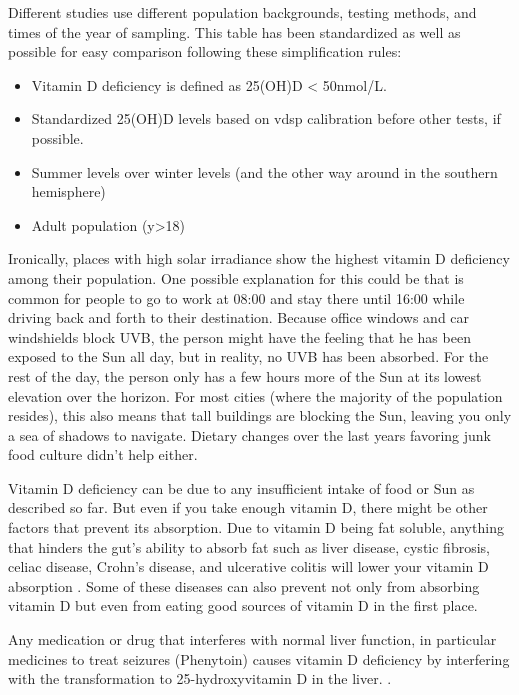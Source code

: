 Different studies use different population backgrounds, testing methods, and times of the year of sampling. This table has been standardized as well as possible for easy comparison following these simplification rules:

\begin{itemize}
    \item Vitamin D deficiency is defined as 25(OH)D < 50nmol/L.
    \item Standardized 25(OH)D levels based on \gls{vdsp} calibration before other tests, if possible.
    \item Summer levels over winter levels (and the other way around in the southern hemisphere)
    \item Adult population (y>18)
\end{itemize}

Ironically, places with high solar irradiance show the highest vitamin D deficiency among their population. One possible explanation for this could be that is common for people to go to work at 08:00 and stay there until 16:00 while driving back and forth to their destination. Because office windows and car windshields block UVB, the person might have the feeling that he has been exposed to the Sun all day, but in reality, no UVB has been absorbed. For the rest of the day, the person only has a few hours more of the Sun at its lowest elevation over the horizon. For most cities (where the majority of the population resides), this also means that tall buildings are blocking the Sun, leaving you only a sea of shadows to navigate. Dietary changes over the last years favoring junk food culture didn't help either.

Vitamin D deficiency can be due to any insufficient intake of food or Sun as described so far. But even if you take enough vitamin D, there might be other factors that prevent its absorption. Due to vitamin D being fat soluble, anything that hinders the gut's ability to absorb fat such as liver disease, cystic fibrosis, celiac disease, Crohn’s disease, and ulcerative colitis will lower your vitamin D absorption \cite{ref:Pappa2008}. Some of these diseases can also prevent not only from absorbing vitamin D but even from eating good sources of vitamin D in the first place.

Any medication or drug that interferes with normal liver function, in particular medicines to treat seizures (Phenytoin) causes vitamin D deficiency by interfering with the transformation to 25-hydroxyvitamin D in the liver. \cite{ref:MiratashiYazdi2017, ref:Bell1979, ref:Faridi2010}. \vspace{3 mm}



